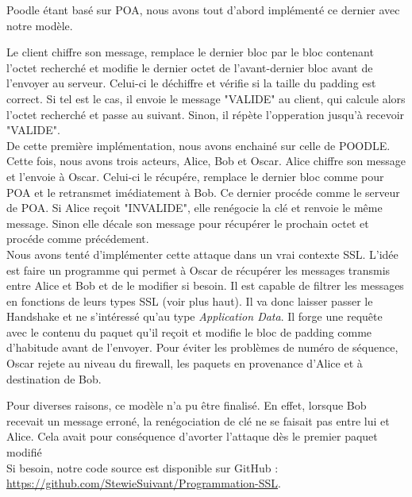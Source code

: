 Poodle étant basé sur POA, nous avons tout  d'abord implémenté ce dernier avec notre modèle.

 Le client chiffre son
message, remplace le dernier bloc par le bloc contenant l'octet recherché et modifie le dernier octet de l'avant-dernier bloc avant de l'envoyer au serveur. Celui-ci le déchiffre et vérifie si la taille du padding est correct. Si
tel est le cas, il envoie le message "VALIDE" au client, qui calcule alors l'octet recherché et passe au suivant.
Sinon, il répète l'opperation jusqu'à recevoir "VALIDE".\\

De cette première implémentation, nous avons enchainé sur celle de POODLE. Cette fois, nous avons trois acteurs,
Alice, Bob et Oscar. Alice chiffre son message et l'envoie à Oscar. Celui-ci le récupére, remplace le dernier bloc
comme pour POA et le retransmet imédiatement à Bob. Ce dernier procéde comme le serveur de POA. Si Alice reçoit
"INVALIDE", elle renégocie la clé et renvoie le même message. Sinon elle décale son message pour récupérer le 
prochain octet et procéde comme précédement.\\

Nous avons tenté d'implémenter cette attaque dans un vrai contexte SSL. L'idée est faire un programme qui permet à
Oscar de récupérer les messages transmis entre Alice et Bob et de le modifier si besoin. Il est capable de filtrer
les messages en fonctions de leurs types SSL (voir plus haut). Il va donc laisser passer le Handshake et ne s'intéressé qu'au type \emph{Application Data}. Il forge une requête avec le contenu du paquet qu'il reçoit et modifie le
bloc de padding comme d'habitude avant de l'envoyer. Pour éviter les problèmes de numéro de séquence, Oscar rejete 
au niveau du firewall, les paquets en provenance d'Alice et à destination de Bob.

Pour diverses raisons, ce modèle n'a pu être finalisé. En effet, lorsque Bob recevait un message erroné,
la renégociation de clé ne se faisait pas entre lui et Alice. Cela avait pour conséquence d'avorter l'attaque
dès le premier paquet modifié\\

Si besoin, notre code source est disponible sur GitHub : \url{https://github.com/StewieSuivant/Programmation-SSL}.

